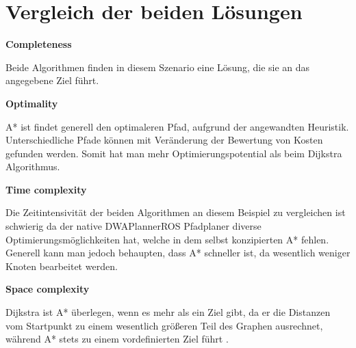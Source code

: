 \documentclass{article}
\begin{document}
\section{Vergleich der beiden Lösungen}

\textbf{Completeness}\newline

Beide Algorithmen finden in diesem Szenario eine Lösung, die sie an das angegebene Ziel führt. 


\textbf{Optimality}\newline

A* ist findet generell den optimaleren Pfad, aufgrund der angewandten Heuristik. Unterschiedliche Pfade können mit Veränderung der Bewertung von Kosten gefunden werden. Somit hat man mehr Optimierungspotential als beim Dijkstra Algorithmus.


\textbf{Time complexity}\newline

Die Zeitintensivität der beiden Algorithmen an diesem Beispiel zu vergleichen ist schwierig da der native DWAPlannerROS Pfadplaner diverse Optimierungsmöglichkeiten hat, welche in dem selbst konzipierten A* fehlen.
Generell kann man jedoch behaupten, dass A* schneller ist, da wesentlich weniger Knoten bearbeitet werden.


\textbf{Space complexity}\newline

Dijkstra ist A* überlegen, wenn es mehr als ein Ziel gibt, da er die Distanzen vom Startpunkt zu einem wesentlich größeren Teil des Graphen ausrechnet, während A* stets zu einem vordefinierten Ziel führt \cite[1]{Dijkstra}.




\end{document}
